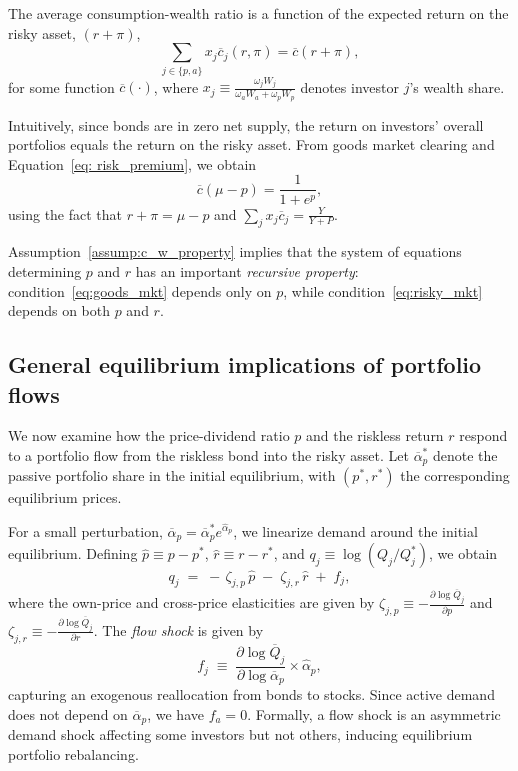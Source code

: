 \begin{assump}\label{assump:c_w_property}
    The average consumption-wealth ratio is a function of the expected return on the risky asset, $(r+\pi)$, 
    \[
        \sum_{j\in\{p,a\}} x_j \overline{c}_j(r,\pi) = \overline{c}(r+\pi),
    \]
    for some function $\overline{c}(\cdot)$, where $x_j \equiv \frac{\omega_j W_j}{\omega_a W_a + \omega_p W_p}$ denotes investor $j$’s wealth share.
\end{assump}

Intuitively, since bonds are in zero net supply, the return on investors’ overall portfolios equals the return on the risky asset.
From goods market clearing and Equation~\eqref{eq: risk_premium}, we obtain
\begin{equation}\label{eq:goods_mkt}
    \overline{c}(\mu-p) = \frac{1}{1+e^p},
\end{equation}
using the fact that $r + \pi = \mu - p$ and $\sum_{j} x_j \overline{c}_j = \frac{Y}{Y+P}$.

Assumption~\ref{assump:c_w_property} implies that the system of equations determining $p$ and $r$ has an important \emph{recursive property}: condition~\eqref{eq:goods_mkt} depends only on $p$, while condition~\eqref{eq:risky_mkt} depends on both $p$ and $r$.


\subsection{General equilibrium implications of portfolio flows}

We now examine how the price-dividend ratio $p$ and the riskless return $r$ respond to a portfolio flow from the riskless bond into the risky asset.
Let $\overline{\alpha}_p^{*}$ denote the passive portfolio share in the initial equilibrium, with $(p^{*}, r^{*})$ the corresponding equilibrium prices.

For a small perturbation, $\overline{\alpha}_p = \overline{\alpha}_p^{*} e^{\hat{\alpha}_p}$, we linearize demand around the initial equilibrium.
Defining $\hat{p}\equiv p-p^{*}$, $\hat{r}\equiv r-r^{*}$, and $q_j \equiv \log(Q_j/Q_j^{*})$, we obtain
\begin{equation}\label{eq:demand_linear}
    q_j \;=\; -\,\zeta_{j,p}\,\hat{p}\;-\;\zeta_{j,r}\,\hat{r}\;+\;f_j,
\end{equation}
where the own-price and cross-price elasticities are given by $\zeta_{j,p} \equiv - \frac{\partial \log \overline{Q}_j }{\partial p}$ and $\zeta_{j,r} \equiv - \frac{\partial \log \overline{Q}_j }{\partial r}$.
The \textit{flow shock} is given by
\[
f_j \;\equiv\; \frac{\partial \log \overline{Q}_j}{\partial \log \overline{\alpha}_p} \times \hat{\alpha}_p,
\]
capturing an exogenous reallocation from bonds to stocks.
Since active demand does not depend on $\overline{\alpha}_p$, we have $f_a=0$.
Formally, a flow shock is an asymmetric demand shock affecting some investors but not others, inducing equilibrium portfolio rebalancing.


